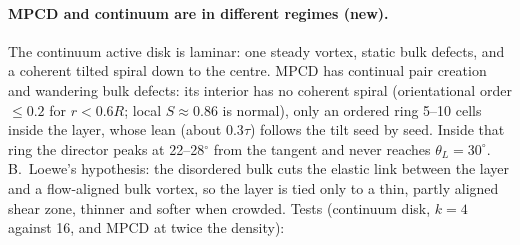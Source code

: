 \documentclass[11pt,a4paper]{article}
\begin{document}
\paragraph{MPCD and continuum are in different regimes (new).} The continuum active disk is laminar: one steady vortex, static bulk defects, and a coherent tilted spiral down to the centre. MPCD has
continual pair creation and wandering bulk defects: its interior has no coherent spiral (orientational order $\le0.2$ for $r<0.6R$; local $S\approx0.86$ is normal), only an ordered ring 5--10 cells inside the layer, whose lean (about $0.3\tau$) follows the
tilt seed by seed. Inside that ring the director peaks at 22--28$^\circ$ from the tangent and never reaches $\theta_L=30^\circ$. B.~Loewe's hypothesis: the disordered bulk cuts the
elastic link between the layer and a flow-aligned bulk vortex, so the layer is tied only to a thin, partly aligned shear zone, thinner and softer when crowded. Tests (continuum disk, $k=4$ against 16, and
MPCD at twice the density):
\end{document}
